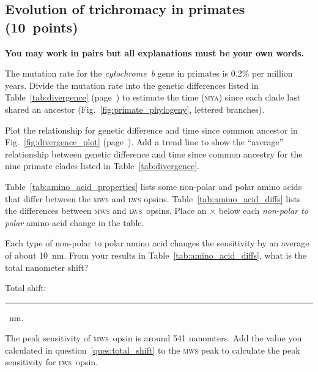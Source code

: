 \documentclass[12pt, addpoints]{exam}
\newcommand{\mws}{\textsc{mws}}
\newcommand{\lws}{\textsc{lws}}
\begin{document}
\subsection*{Evolution of trichromacy in primates (10~points)}

\textbf{You may work in pairs but all explanations must be your own words.}

\begin{questions}

\begin{multicols}{2}

\question
The mutation rate for the \textit{cytochrome~b} gene in primates is 0.2\% per million years. %
Divide the mutation rate into the genetic differences listed in Table~\ref{tab:divergence} (page~\pageref{tab:divergence}) to estimate the time (\textsc{mya}) since each clade last shared an ancestor (Fig.~\ref{fig:primate_phylogeny}, lettered branches). 

\bigskip


\question
Plot the relationship for genetic difference and time since common ancestor in Fig.~\ref{fig:divergence_plot} (page~\pageref{tab:divergence}). Add a trend line to show the “average” relationship between genetic difference and time since common ancestry for the nine primate clades listed in Table~\ref{tab:divergence}.

\bigskip

\question
Table~\ref{tab:amino_acid_properties} lists some non-polar and polar amino acids that differ between the \mws{} and \lws{} opsins. Table~\ref{tab:amino_acid_diffs} lists the differences between \mws{} and \lws{}~opsins. Place an {\large $\times$} below each \textit{non-polar to polar} amino acid change in the table.

\bigskip

\question\label{ques:total_shift}
Each type of non-polar to polar amino acid changes the sensitivity by an average of about 10~nm. From your results in Table~\ref{tab:amino_acid_diffs}, what is the total nanometer shift?

\medskip

Total shift: \rule{1.5cm}{0.4pt}~nm.

\question\label{ques:long_peak}
 The peak sensitivity of \mws{}~opsin is around 541 nanomters. Add the value you calculated in question~\ref{ques:total_shift} to the \mws{} peak to calculate the peak sensitivity for \lws{}~opsin.

\medskip


\end{multicols}
\end{questions}
\end{document}
